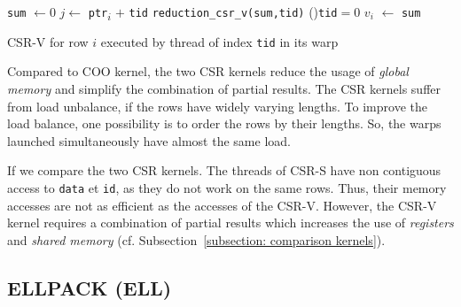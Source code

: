 \documentclass[runningheads,orivec]{llncs}
\begin{document}
\begin{algorithm}[]
 \BlankLine
 \small 
 \texttt{sum} $\leftarrow 0$\;
 $j\leftarrow$ \texttt{ptr}\textsubscript{$i$} $+$ \texttt{tid}
   \texttt{reduction\_csr\_v(sum,tid)}
  \If(){\texttt{\upshape tid}$=0$}{
  	$v_i$ $\leftarrow$ \texttt{sum}\;
  } 
 \caption{\small CSR-V for row $i$ executed by thread of index \texttt{tid} in its warp}
\label{Kernel::CSR}

\end{algorithm}




Compared to COO kernel, the two CSR kernels reduce the usage of \textit{global memory} and simplify the combination of partial results. The CSR kernels suffer from load unbalance, if the rows have widely varying lengths. To improve the load balance, one possibility is to order the rows by their lengths. So, the warps launched simultaneously have almost the same load.

If we compare the two CSR kernels. The threads of CSR-S have non contiguous access to \texttt{data} et \texttt{id}, as they do not work on the same rows. Thus, their memory accesses are not as efficient as the accesses of the CSR-V. However, the CSR-V kernel requires a combination of partial results which increases the use of \textit{registers} and \textit{shared memory} (cf. Subsection~\ref{subsection: comparison kernels}).

\vspace*{-0.25cm}

\subsection*{ELLPACK (ELL)}
\vspace*{-0.25cm}
\end{document}
